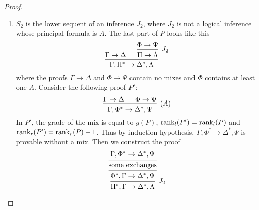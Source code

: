 \documentclass[11pt]{article}
\begin{document}
\begin{proof}
\begin{enumerate}
\begin{enumerate}
\begin{enumerate}
\item \(S_2\) is the lower sequent of an inference \(J_2\), where \(J_2\)
is not a logical inference whose principal formula is \(A\). The
last part of \(P\) looks like this
\begin{equation*}
\begin{prooftree}%
\hypo{\Gamma\to\Delta}
\hypo{\Phi\to\Psi}
\infer1[\(J_2\)]{\Pi\to\Lambda}
\infer2{\Gamma,\Pi^*\to\Delta^*,\Lambda}
\end{prooftree}
\end{equation*}
where the proofs \(\Gamma\to\Delta\) and \(\Phi\to\Psi\) contain no
mixes and \(\Phi\) contains at least one \(A\). Consider the following
proof \(P'\):
\begin{equation*}
\begin{prooftree}%
\hypo{\Gamma\to\Delta}
\hypo{\Phi\to\Psi}
\infer2[(\(A\))]{\Gamma,\Phi^*\to\Delta^*,\Psi}
\end{prooftree}
\end{equation*}
In \(P'\), the grade of the mix is equal to \(g(P)\),
\(\text{rank}_l(P')=\text{rank}_l(P)\) and \(\text{rank}_r(P')=\text{rank}_r(P)-1\). Thus by
induction hypothesis, \(\Gamma,\Phi^*\to\Delta^*,\Psi\) is provable without
a mix. Then we construct the proof 
\begin{equation*}
\begin{prooftree}%
\hypo{\Gamma,\Phi^*\to\Delta^*,\Psi}
\infer1{\text{some exchanges}}
\infer1{\Phi^*,\Gamma\to\Delta^*,\Psi}
\infer1[\(J_2\)]{\Pi^*,\Gamma\to\Delta^*,\Lambda}
\end{prooftree}
\end{equation*}


\end{enumerate}
\end{enumerate}
\end{enumerate}
\end{proof}
\end{document}
